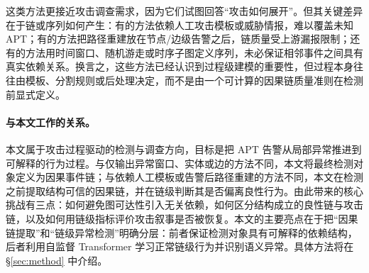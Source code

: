 这类方法更接近攻击调查需求，因为它们试图回答“攻击如何展开”。但其关键差异在于链或序列如何产生：有的方法依赖人工攻击模板或威胁情报，难以覆盖未知 APT；有的方法把路径重建放在节点/边级告警之后，链质量受上游漏报限制；还有的方法用时间窗口、随机游走或时序子图定义序列，未必保证相邻事件之间具有真实依赖关系。换言之，这些方法已经认识到过程级建模的重要性，但过程本身往往由模板、分割规则或后处理决定，而不是由一个可计算的因果链质量准则在检测前显式定义。

\paragraph{与本文工作的关系。}

本文属于攻击过程驱动的检测与调查方向，目标是把 APT 告警从局部异常推进到可解释的行为过程。与仅输出异常窗口、实体或边的方法不同，本文将最终检测对象定义为因果事件链；与依赖人工模板或告警后路径重建的方法不同，本文在检测之前提取结构可信的因果链，并在链级判断其是否偏离良性行为。由此带来的核心挑战有三点：如何避免图可达性引入无关依赖，如何区分结构成立的良性链与攻击链，以及如何用链级指标评价攻击叙事是否被恢复。本文的主要亮点在于把“因果链提取”和“链级异常检测”明确分层：前者保证检测对象具有可解释的依赖结构，后者利用自监督 Transformer 学习正常链级行为并识别语义异常。具体方法将在 \S\ref{sec:method} 中介绍。

